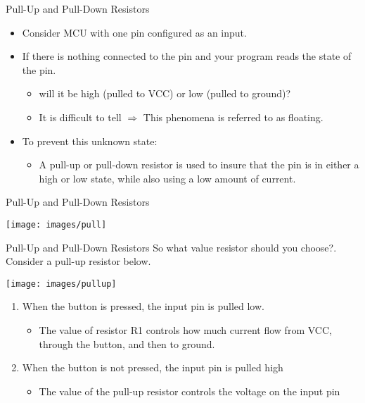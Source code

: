 \documentclass{beamer}
\begin{document}
\begin{darkframes}
\begin{frame}[<+->]{Pull-Up and Pull-Down Resistors}
	\begin{itemize}
		\item Consider MCU with one pin configured as an input.
		\item If there is nothing connected to the pin and your program reads the state of the pin.
		\begin{itemize}
			\item will it be high (pulled to VCC) or low (pulled to ground)?
			\item It is difficult to tell $\Rightarrow$ This phenomena is referred to as \alert{floating}.
		\end{itemize}
	\item To prevent this unknown state: 
	\begin{itemize}
		\item A pull-up or pull-down resistor is used to insure that the pin is in either a high or low state, while also using a low amount of current.
	\end{itemize}
	\end{itemize}
\end{frame}     

\begin{frame}[<+->]{Pull-Up and Pull-Down Resistors}
	
	\begin{center}
		\texttt{[image: images/pull]} 
	\end{center}
	
\end{frame}     

\begin{frame}[<+->]{Pull-Up and Pull-Down Resistors}
So what value resistor should you choose?. Consider a pull-up resistor below.
	\begin{center}
		\texttt{[image: images/pullup]} 
	\end{center}
	\begin{enumerate}
		
		\item When the button is pressed, the input pin is pulled low.
		\begin{itemize}
			\item The value of resistor R1 controls how much current flow from VCC, through the button, and then to ground.
		\end{itemize}
		\item When the button is not pressed, the input pin is pulled high
		\begin{itemize}
			\item The value of the pull-up resistor controls the voltage on the input pin
		\end{itemize}
	\end{enumerate}
\end{frame} 


\end{darkframes}
\end{document}
